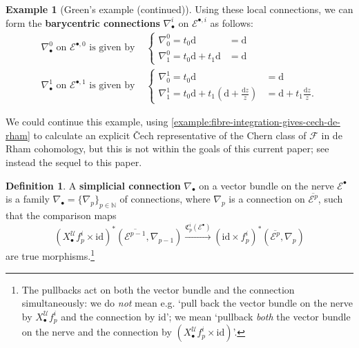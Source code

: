 \documentclass[11pt,fleqn]{article}
\theoremstyle{plain}
\theoremstyle{definition}
\newtheorem{definition}[theorem]{Definition}
\newtheorem{example}[theorem]{Example}
\theoremstyle{remark}
\numberwithin{equation}{theorem}
\newcommand{\cover}{\mathcal{U}}
\newcommand{\id}{\mathrm{id}}
\newcommand{\define}[1]{\textbf{#1}}
\newcommand{\nerve}[1]{X_{#1}^\cover}
\newcommand{\comparison}[1]{\mathfrak{C}_{#1}}
\renewcommand{\d}{\mathrm{d}}
\begin{document}
\begin{example}[Green's example (continued)]
            Using these local connections, we can form the \define{barycentric connections} $\nabla_\bullet^i$ on $\mathcal{E}^{\bullet,i}$ as follows:
            \begin{align*}
                \nabla_\bullet^0\text{ on }\mathcal{E}^{\bullet,0}\text{ is given by }
                &\begin{cases}
                    \nabla_0^0 = t_0\d&=\d\\
                    \nabla_1^0 = t_0\d+t_1\d&=\d
                \end{cases}\\
                \nabla_\bullet^1\text{ on }\mathcal{E}^{\bullet,1}\text{ is given by }
                &\begin{cases}
                    \nabla_0^1 = t_0\d&=\d\\
                    \nabla_1^1 = t_0\d+t_1\left(\d+\frac{\d z}{z}\right)&=\d+t_1\frac{\d z}{z}.
                \end{cases}
            \end{align*}

            \medskip

            We could continue this example, using \cref{example:fibre-integration-gives-cech-de-rham} to calculate an explicit Čech representative of the Chern class of $\mathscr{F}$ in de Rham cohomology, but this is not within the goals of this current paper; see instead the sequel to this paper.
        \end{example}

        \begin{definition}\label{definition:simplicial-connection}
            A \define{simplicial connection} $\nabla_\bullet$ on a vector bundle on the nerve $\mathcal{E}^\bullet$ is a family $\nabla_\bullet=\{\nabla_p\}_{p\in\mathbb{N}}$ of connections, where $\nabla_p$ is a connection on $\overline{\mathcal{E}^p}$, such that the comparison maps
            \[
                \left(\nerve{\bullet}f_p^i\times\id\right)^*
                \left(\overline{\mathcal{E}^{p-1}},\nabla_{p-1}\right)
                \xrightarrow{\comparison{p}^i(\mathcal{E}^\bullet)}
                \left(\id\times f_p^i\right)^*
                \left(\overline{\mathcal{E}^p},\nabla_p\right)
            \]
            are true morphisms.\footnote{The pullbacks act on both the vector bundle and the connection simultaneously: we do \emph{not} mean e.g. `pull back the vector bundle on the nerve by $\nerve{\bullet}f_p^i$ and the connection by $\id$'; we mean `pullback \emph{both} the vector bundle on the nerve and the connection by $(\nerve{\bullet}f_p^i\times\id)$'.}
        \end{definition}
\end{document}
